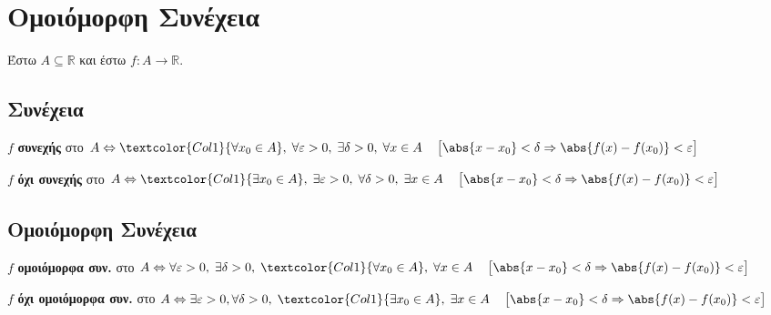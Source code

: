 


\geometry{left=12.63mm,right=12.63mm,top=30.25mm, bottom=36.25mm,footskip=24.16mm,
headsep=24.16mm}

\pagestyle{vangelis}
\everymath{\displaystyle}

\renewcommand{\qedsymbol}{}




\chapter{Ομοιόμορφη Συνέχεια}

Έστω $A \subseteq \mathbb{R} $ και έστω $ f \colon A \to \mathbb{R} $.  

\section{Συνέχεια}

\begin{dfn}
  $f$ \textbf{συνεχής} στο $A \Leftrightarrow \textcolor{Col1}{\forall x_{0} \in A}, \; 
  \forall \varepsilon > 0, \; \exists \delta > 0, \; \forall x \in A \quad 
  \left[\strut\abs{x - x_{0}} < \delta \Rightarrow \abs{f(x)-f(x_{0})} < 
  \varepsilon\right] $ 
\end{dfn}

\begin{dfn}
  $f$ \textbf{όχι συνεχής} στο $A \Leftrightarrow 
  \textcolor{Col1}{\exists x_{0} \in A}, \; \exists
  \varepsilon > 0, \; \forall \delta > 0, \; \exists x \in A \quad \left[\strut\abs{x - 
  x_{0}} < \delta \Rightarrow \abs{f(x)-f(x_{0})} < \varepsilon\right] $ 
\end{dfn}

\section{Ομοιόμορφη Συνέχεια}

\begin{dfn}
  $f$ \textbf{ομοιόμορφα συν.} στο 
  $A \Leftrightarrow \forall \varepsilon > 0, \; 
  \exists \delta > 0, \; \textcolor{Col1}{\forall x_{0} \in A}, \; \forall x \in A 
  \quad \left[\strut\abs{x - x_{0}} < \delta \Rightarrow \abs{f(x)-f(x_{0})} < 
  \varepsilon\right] $ 
\end{dfn}

\begin{dfn}
  $f$ \textbf{όχι ομοιόμορφα συν.} στο $A \Leftrightarrow 
  \exists \varepsilon > 0, \forall \delta > 0, \; 
  \textcolor{Col1}{\exists x_{0} \in A}, \; \exists x \in A \quad 
  \left[\strut\abs{x - x_{0}} < \delta \Rightarrow \abs{f(x)- f(x_{0})} < 
  \varepsilon\right] $ 
\end{dfn}

